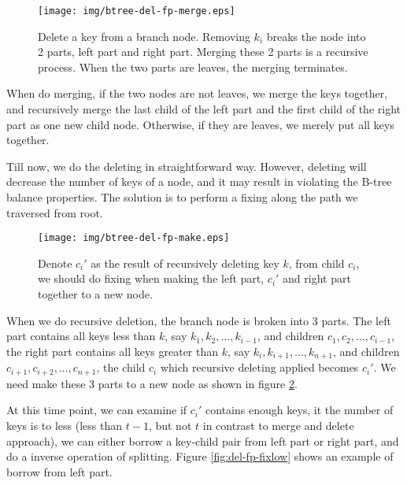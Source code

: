 \documentclass{article}
\begin{document}
\begin{figure}[htbp]
    \begin{center}
      \texttt{[image: img/btree-del-fp-merge.eps]}
      \caption{Delete a key from a branch node. Removing $k_i$ breaks
the node into 2 parts, left part and right part. Merging these 2 parts
is a recursive process. When the two parts are leaves, the merging
terminates.} \label{fig:del-fp-merge}
    \end{center}
\end{figure}

When do merging, if the two nodes are not leaves, we merge the keys
together, and recursively merge the last child of the left part
and the first child of the right part as one new child node. Otherwise,
if they are leaves, we merely put all keys together.

Till now, we do the deleting in straightforward way. However, deleting
will decrease the number of keys of a node, and it may result in
violating the B-tree balance properties. The solution is to perform a
fixing along the path we traversed from root.

\begin{figure}[htbp]
    \begin{center}
      \texttt{[image: img/btree-del-fp-make.eps]}
      \caption{Denote $c_i'$ as the result of recursively deleting
key $k$, from child $c_i$, we should do fixing when making the
left part, $c_i'$ and right part together to a new node.} \label{fig:del-fp-make}
    \end{center}
\end{figure}

When we do recursive deletion, the branch node is broken into 3 parts.
The left part contains all keys less than $k$, say $k_1, k_2, ..., k_{i-1}$,
and children $c_1, c_2, ..., c_{i-1}$, the right part contains all keys
greater than $k$, say $k_i, k_{i+1}, ..., k_{n+1}$, and children
$c_{i+1}, c_{i+2}, ..., c_{n+1}$, the child $c_i$ which recursive deleting
applied becomes $c_i'$. We need make these 3 parts to a new node
as shown in figure \ref{fig:del-fp-make}.

At this time point, we can examine if $c_i'$ contains enough keys,
it the number of keys is to less (less than $t-1$, but not $t$ in
contrast to merge and delete approach), we can either borrow a key-child
pair from left part or right part, and do a inverse operation of
splitting. Figure \ref{fig:del-fp-fixlow} shows an example of borrow from left part.
\end{document}
